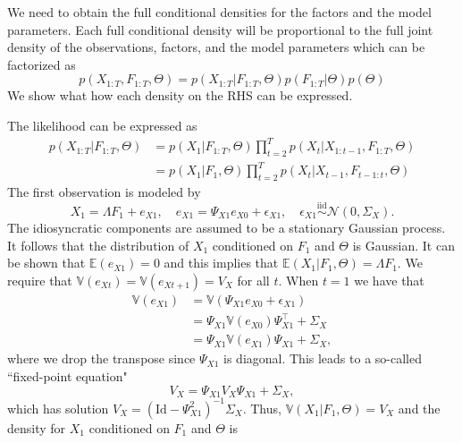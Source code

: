 We need to obtain the full conditional densities for the factors and the model parameters. Each full conditional density will be proportional to the full joint density of the observations, factors, and the model parameters which can be factorized as
\begin{equation}
	p \left( X_{1:T}, F_{1:T}, \Theta \right) = p \left( X_{1:T} | F_{1:T}, \Theta \right) p \left( F_{1:T} | \Theta \right) p \left( \Theta \right)
\end{equation}
We show what how each density on the RHS can be expressed.

The likelihood can be expressed as
\begin{align}
	p \left( X_{1:T} | F_{1:T} , \Theta \right) 
	&= p \left( X_1 | F_{1:T}, \Theta  \right) \prod_{t = 2}^T p \left( X_t | X_{1:t-1}, F_{1:T}, \Theta \right) \\
	&= p \left( X_1 | F_1, \Theta \right) \prod_{t = 2}^T p \left( X_t | X_{t-1}, F_{t-1:t}, \Theta \right)
\end{align}
The first observation is modeled by 
\begin{equation*}
	X_1 = \Lambda F_1 + e_{X1}, \quad e_{X1} = \Psi_{X1} e_{X0} + \epsilon_{X1}, \quad 	\epsilon_{X1} \overset{\text{iid}}{\sim} \mathcal N \left( 0, \Sigma_X \right).
\end{equation*}
The idiosyncratic components are assumed to be a stationary Gaussian process. 
It follows that the distribution of $X_1$ conditioned on $F_1$ and $\Theta$ is Gaussian. 
It can be shown that $\mathbb E \left( e_{X1} \right) = 0$ and this implies that $\mathbb E \left( X_1 | F_1, \Theta \right) = \Lambda F_1$. 
We require that $\mathbb V \left( e_{Xt} \right) = \mathbb V \left( e_{Xt+1} \right) = V_X$ for all $t$. When $t = 1$ we have that
\begin{align*}
	\mathbb V \left( e_{X1} \right) &= \mathbb V \left( \Psi_{X1} e_{X0} + \epsilon_{X1} \right) \\
	&= \Psi_{X1} \mathbb V \left( e_{X0} \right) \Psi_{X1}^{\top} + \Sigma_X \\
	&= \Psi_{X1} \mathbb V \left( e_{X1} \right) \Psi_{X1} + \Sigma_X,
\end{align*}
where we drop the transpose since $\Psi_{X1}$ is diagonal. This leads to a so-called ``fixed-point equation" 
\begin{equation*}
	V_X = \Psi_{X1} V_X \Psi_{X1} + \Sigma_X,	
\end{equation*}
which has solution $V_X = \left( \text{Id} - \Psi_{X1}^2 \right)^{-1} \Sigma_X$. 
Thus, $\mathbb V \left( X_1 | F_1, \Theta \right) = V_X$ and the density for $X_1$ conditioned on $F_1$ and $\Theta$ is
